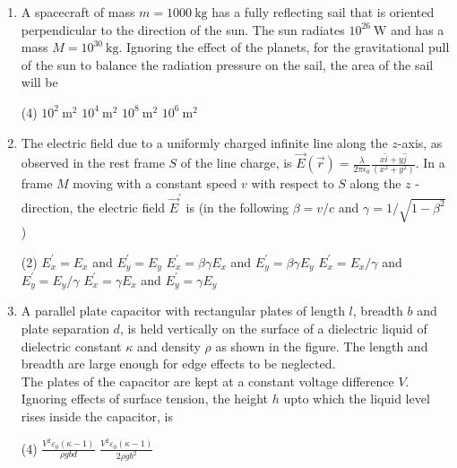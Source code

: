 \begin{enumerate}
 \begin{tasks}(4)
	\task[\textbf{a.}] $\sqrt{3} a / 2$
	\task[\textbf{b.}]$a / 2$
	\task[\textbf{c.}] $a$
	\task[\textbf{d.}] $\sqrt{2} a$
\end{tasks}
\item  A spacecraft of mass $m=1000 \mathrm{~kg}$ has a fully reflecting sail that is oriented perpendicular to the direction of the sun. The sun radiates $10^{26} \mathrm{~W}$ and has a mass $M=10^{30} \mathrm{~kg}$. Ignoring the effect of the planets, for the gravitational pull of the sun to balance the radiation pressure on the sail, the area of the sail will be
 \begin{tasks}(4)
	\task[\textbf{a.}]$10^{2} \mathrm{~m}^{2}$
	\task[\textbf{b.}]$10^{4} \mathrm{~m}^{2}$
	\task[\textbf{c.}]$10^{8} \mathrm{~m}^{2}$
	\task[\textbf{d.}] $10^{6} \mathrm{~m}^{2}$
\end{tasks}
\item The electric field due to a uniformly charged infinite line along the $z$-axis, as observed in the rest frame $S$ of the line charge, is $\vec{E}(\vec{r})=\frac{\lambda}{2 \pi \epsilon_{0}} \frac{x \hat{i}+y \hat{j}}{\left(x^{2}+y^{2}\right)}$. In a frame $M$ moving with a constant speed $v$ with respect to $S$ along the $z$ - direction, the electric field $\vec{E}^{\prime}$ is (in the following $\beta=v / c$ and $\gamma=1 / \sqrt{1-\beta^{2}}$ )
 \begin{tasks}(2)
	\task[\textbf{a.}]$E_{x}^{\prime}=E_{x}$ and $E_{y}^{\prime}=E_{y}$
	\task[\textbf{b.}]$E_{x}^{\prime}=\beta \gamma E_{x}$ and $E_{y}^{\prime}=\beta \gamma E_{y}$
	\task[\textbf{c.}]$E_{x}^{\prime}=E_{x} / \gamma$ and $E_{y}^{\prime}=E_{y} / \gamma$
	\task[\textbf{d.}]  $E_{x}^{\prime}=\gamma E_{x}$ and $E_{y}^{\prime}=\gamma E_{y}$
\end{tasks}
\item A parallel plate capacitor with rectangular plates of length $l$, breadth $b$ and plate separation $d$, is held vertically on the surface of a dielectric liquid of dielectric constant $\kappa$ and density $\rho$ as shown in the figure. The length and breadth are large enough for edge effects to be neglected.\\
The plates of the capacitor are kept at a constant voltage difference $V$. Ignoring effects of surface tension, the height $h$ upto which the liquid level rises inside the capacitor, is
 \begin{tasks}(4)
	\task[\textbf{a.}]$\frac{V^{2} \varepsilon_{0}(\kappa-1)}{\rho g b d}$
	\task[\textbf{b.}]$\frac{V^{2} \varepsilon_{0}(\kappa-1)}{2 \rho g b^{2}}$

\end{tasks}
\end{enumerate}
